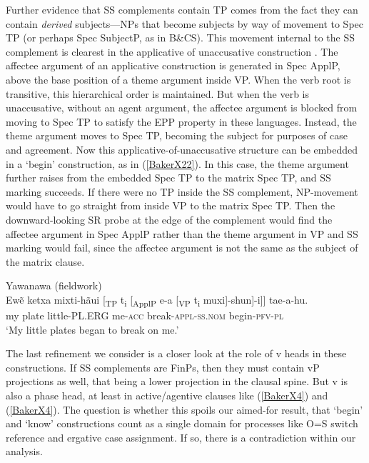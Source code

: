 \documentclass[output=paper,colorlinks,citecolor=brown,
]{langscibook}
\renewcommand{\sc}[1]{\textsc{#1}}
\begin{document}
Further evidence that SS complements contain TP comes from the fact they can contain \textit{derived} subjects—NPs that become subjects by way of movement to Spec TP (or perhaps Spec SubjectP, as in B\&CS). This movement internal to the SS complement is clearest in the applicative of unaccusative construction \citep[see][]{baker2014dependent}. The affectee argument of an applicative construction is generated in Spec ApplP, above the base position of a theme argument inside VP. When the verb root is transitive, this hierarchical order is maintained. But when the verb is unaccusative, without an agent argument, the affectee argument is blocked from moving to Spec TP to satisfy the EPP property in these languages. Instead, the theme argument moves to Spec TP, becoming the subject for purposes of case and agreement. Now this applicative-of-unaccusative structure can be embedded in a `begin’ construction, as in (\ref{BakerX22}). In this case, the theme argument further raises from the embedded Spec TP to the matrix Spec TP, and SS marking succeeds. If there were no TP inside the SS complement, NP-movement would have to go straight from inside VP to the matrix Spec TP. Then the downward-looking SR probe at the edge of the complement would find the affectee argument in Spec ApplP rather than the theme argument in VP and SS marking would fail, since the affectee argument is not the same as the subject of the matrix clause.

\begin{exe}
    \ex Yawanawa (fieldwork) \label{BakerX22}\\
		\small	\gll Ewẽ ketxa {mixti-hãui [\textsubscript{TP} t\textsubscript{i}} {[\textsubscript{ApplP} e-a} {[\textsubscript{VP} t\textsubscript{i} muxi]-shun]-i]}] tae-a-hu.\\
			    my plate little-\sc{PL.ERG} me-\sc{acc} break-\sc{appl-ss.nom} begin-\sc{pfv-pl}\\
			    \glt `My little plates began to break on me.'
\end{exe}

The last refinement we consider is a closer look at the role of v heads in these constructions. If SS complements are FinPs, then they must contain vP projections as well, that being a lower projection in the clausal spine. But v is also a phase head, at least in active/agentive clauses like (\ref{BakerX4}) and (\ref{BakerX4}). The question is whether this spoils our aimed-for result, that ‘begin’ and ‘know’ constructions count as a single domain for processes like O=S switch reference and ergative case assignment. If so, there is a contradiction within our analysis.\\
\end{document}
